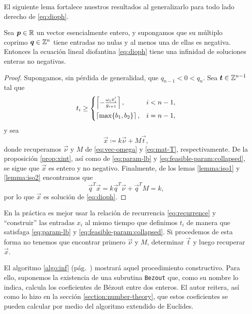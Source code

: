 El siguiente lema fortalece nuestros resultados al generalizarlo para todo lado derecho de
\eqref{eq:dioph}.
\begin{lemma}
	\label{lemma:t-existence}
	Sea $\boldsymbol{p} \in \mathbb{R}$ un vector esencialmente entero, y supongamos que su múltiplo coprimo
	$\boldsymbol{q} \in \mathbb{Z}^n$ tiene entradas no nulas y al menos una de ellas es negativa. Entonces la
	ecuación lineal diofantina \eqref{eq:dioph} tiene una infinidad de soluciones enteras no
	negativas.
\end{lemma}
\begin{proof}
	Supongamos, sin pérdida de generalidad, que $q_{n-1} < 0 < q_n$. Sea $\boldsymbol{t} \in \mathbb{Z}^{n-1}$ tal
	que
	\begin{equation*}
		t_i \geq \begin{cases}
			\left\lceil -\frac{\omega_ix_i'}{g_{i + 1}} \right\rceil, & i < n - 1, \\[0.5em]
			\left\lceil \max\lbrace b_1, b_2 \rbrace \right\rceil, & i = n - 1,
		\end{cases}
	\end{equation*}
	y sea
	\begin{equation*}
		\vec{x} \coloneq k\vec{\nu} + M\vec{t},
	\end{equation*}
	donde recuperamos $\vec{\nu}$ y $M$ de \eqref{eq:vec-omega} y \eqref{eq:mat-T}, respectivamente.
	De la proposición \ref{prop:xint}, así como de \eqref{eq:param-lb} y
	\eqref{eq:feasible-param:collapsed}, se sigue que $\vec{x}$ es entero y no negativo. Finalmente,
	de los lemas \ref{lemma:iso1} y \ref{lemma:iso2} encontramos que
	\begin{equation*}
		\vec{q}^T\vec{x} = k\vec{q}^T\vec{\nu} + \vec{q}^TM = k,
	\end{equation*}
	por lo que $\vec{x}$ es solución de \eqref{eq:dioph}.
\end{proof}

En la práctica es mejor usar la relación de recurrencia \eqref{eq:recurrence} y ``construir'' las
entradas $x_i$ al mismo tiempo que definimos $t_i$ de manera que satisfaga \eqref{eq:param-lb} y
\eqref{eq:feasible-param:collapsed}. Si procedemos de esta forma no tenemos que encontrar primero
$\vec{\nu}$ y $M$, determinar $\vec{t}$ y luego recuperar $\vec{x}$.

El algoritmo \ref{algo:inf} (pág.~\pageref{algo:inf}) mostrará aquel procedimiento constructivo.
Para ello, suponemos la existencia de una subrutina \texttt{Bezout} que, como su nombre lo indica,
calcula los coeficientes de Bézout entre dos enteros. El autor reitera, así como lo hizo en la
sección \ref{section:number-theory}, que estos coeficientes se pueden calcular por medio del
algoritmo extendido de Euclides.

